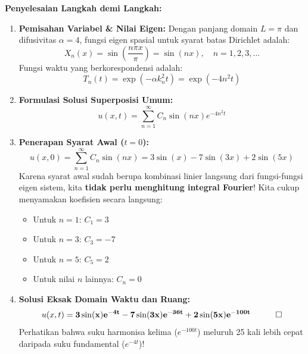 \documentclass[11pt,a4paper]{article}
\theoremstyle{definition}
\begin{document}
\noindent\textbf{Penyelesaian Langkah demi Langkah:}
\begin{enumerate}[leftmargin=*]
    \item \textbf{Pemisahan Variabel \& Nilai Eigen:}
    Dengan panjang domain $L = \pi$ dan difusivitas $\alpha = 4$, fungsi eigen spasial untuk syarat batas Dirichlet adalah:
    \begin{equation*}
        X_n(x) = \sin\left(\frac{n\pi x}{\pi}\right) = \sin(nx), \quad n = 1, 2, 3, \dots
    \end{equation*}
    Fungsi waktu yang berkorespondensi adalah:
    \begin{equation*}
        T_n(t) = \exp(-\alpha k_n^2 t) = \exp(-4 n^2 t)
    \end{equation*}
    
    \item \textbf{Formulasi Solusi Superposisi Umum:}
    \begin{equation*}
        u(x, t) = \sum_{n=1}^{\infty} C_n \sin(nx) e^{-4n^2 t}
    \end{equation*}
    
    \item \textbf{Penerapan Syarat Awal ($t = 0$):}
    \begin{equation*}
        u(x, 0) = \sum_{n=1}^{\infty} C_n \sin(nx) = 3 \sin(x) - 7 \sin(3x) + 2 \sin(5x)
    \end{equation*}
    Karena syarat awal sudah berupa kombinasi linier langsung dari fungsi-fungsi eigen sistem, kita \textbf{tidak perlu menghitung integral Fourier}! Kita cukup menyamakan koefisien secara langsung:
    \begin{itemize}[leftmargin=*]
        \item Untuk $n = 1$: $C_1 = 3$
        \item Untuk $n = 3$: $C_3 = -7$
        \item Untuk $n = 5$: $C_5 = 2$
        \item Untuk nilai $n$ lainnya: $C_n = 0$
    \end{itemize}
    
    \item \textbf{Solusi Eksak Domain Waktu dan Ruang:}
    \begin{equation*}
        u(x, t) = \mathbf{3 \sin(x) e^{-4t} - 7 \sin(3x) e^{-36t} + 2 \sin(5x) e^{-100t}} \quad \qed
    \end{equation*}
    Perhatikan bahwa suku harmonisa kelima ($e^{-100t}$) meluruh 25 kali lebih cepat daripada suku fundamental ($e^{-4t}$)!
\end{enumerate}
\end{document}
